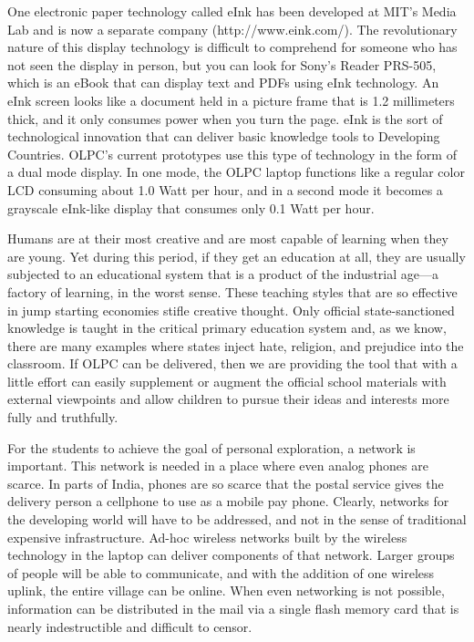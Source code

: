 \documentclass[12pt,twoside,letterpaper]{article}
\begin{document}
One electronic paper technology called eInk has been developed at MIT's Media Lab and is now a separate company (http://www.eink.com/). The revolutionary nature of this display technology is difficult to comprehend for someone who has not seen the display in person, but you can look for Sony's Reader PRS-505, which is an eBook that can display text and PDFs using eInk technology. An eInk screen looks like a document held in a picture frame that is 1.2 millimeters thick, and it only consumes power when you turn the page. eInk is the sort of technological innovation that can deliver basic knowledge tools to Developing Countries. OLPC's current prototypes use this type of technology in the form of a dual mode display. In one mode, the OLPC laptop functions like a regular color LCD consuming about 1.0 Watt per hour, and in a second mode it becomes a grayscale eInk-like display that consumes only 0.1 Watt per hour.

Humans are at their most creative and are most capable of learning when they are young. Yet during this period, if they get an education at all, they are usually subjected to an educational system that is a product of the industrial age\cite{1245651}—a factory of learning, in the worst sense. These teaching styles that are so effective in jump starting economies stifle creative thought. Only official state-sanctioned knowledge is taught in the critical primary education system and, as we know, there are many examples where states inject hate, religion, and prejudice into the classroom. If OLPC can be delivered, then we are providing the tool that with a little effort can easily supplement or augment the official school materials with external viewpoints and allow children to pursue their ideas and interests more fully and truthfully.

For the students to achieve the goal of personal exploration, a network is important. This network is needed in a place where even analog phones are scarce. In parts of India, phones are so scarce that the postal service gives the delivery person a cellphone to use as a mobile pay phone. Clearly, networks for the developing world will have to be addressed, and not in the sense of traditional expensive infrastructure\cite{303858}. Ad-hoc wireless networks built by the wireless technology in the laptop can deliver components of that network. Larger groups of people will be able to communicate, and with the addition of one wireless uplink, the entire village can be online. When even networking is not possible, information can be distributed in the mail via a single flash memory card that is nearly indestructible and difficult to censor.
\end{document}
